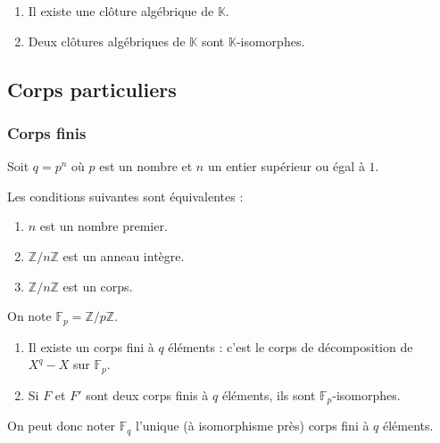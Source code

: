   \begin{theorem}[Steinitz]
    \begin{enumerate}[label=(\roman*)]
      \item Il existe une clôture algébrique de $\mathbb{K}$.
      \item Deux clôtures algébriques de $\mathbb{K}$ sont $\mathbb{K}$-isomorphes.
    \end{enumerate}
  \end{theorem}

  \subsection{Corps particuliers}

  \subsubsection{Corps finis}

  Soit $q = p^n$ où $p$ est un nombre et $n$ un entier supérieur ou égal à $1$.


  \begin{proposition}
    Les conditions suivantes sont équivalentes :
    \begin{enumerate}[label=(\roman*)]
      \item $n$ est un nombre premier.
      \item $\mathbb{Z}/n\mathbb{Z}$ est un anneau intègre.
      \item $\mathbb{Z}/n\mathbb{Z}$ est un corps.
    \end{enumerate}
  \end{proposition}

  \begin{notation}
    On note $\mathbb{F}_p = \mathbb{Z}/p\mathbb{Z}$.
  \end{notation}


  \begin{theorem}
    \begin{enumerate}[label=(\roman*)]
      \item Il existe un corps fini à $q$ éléments : c'est le corps de décomposition de $X^q - X$ sur $\mathbb{F}_p$.
      \item Si $F$ et $F'$ sont deux corps finis à $q$ éléments, ils sont $\mathbb{F}_p$-isomorphes.
    \end{enumerate}
    On peut donc noter $\mathbb{F}_q$ l'unique (à isomorphisme près) corps fini à $q$ éléments.
  \end{theorem}

